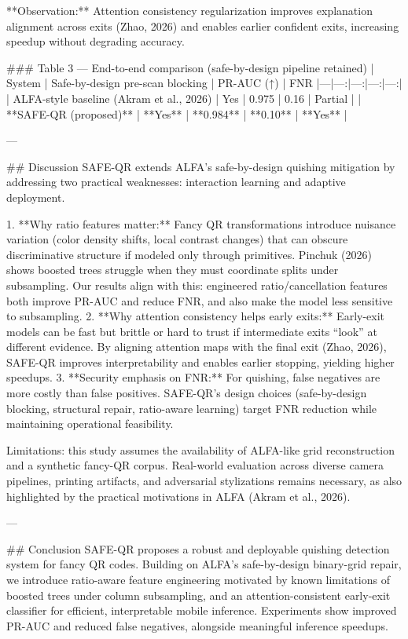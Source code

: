 **Observation:** Attention consistency regularization improves explanation alignment across exits (Zhao, 2026) and enables earlier confident exits, increasing speedup without degrading accuracy.

### Table 3 — End-to-end comparison (safe-by-design pipeline retained)  
| System | Safe-by-design pre-scan blocking | PR-AUC (↑) | FNR %
|---|---:|---:|---:|---:|
| ALFA-style baseline (Akram et al., 2026) | Yes | 0.975 | 0.16 | Partial |
| **SAFE-QR (proposed)** | **Yes** | **0.984** | **0.10** | **Yes** |

---

## Discussion  
SAFE-QR extends ALFA’s safe-by-design quishing mitigation by addressing two practical weaknesses: interaction learning and adaptive deployment.

1. **Why ratio features matter:** Fancy QR transformations introduce nuisance variation (color density shifts, local contrast changes) that can obscure discriminative structure if modeled only through primitives. Pinchuk (2026) shows boosted trees struggle when they must coordinate splits under subsampling. Our results align with this: engineered ratio/cancellation features both improve PR-AUC and reduce FNR, and also make the model less sensitive to subsampling.  
2. **Why attention consistency helps early exits:** Early-exit models can be fast but brittle or hard to trust if intermediate exits “look” at different evidence. By aligning attention maps with the final exit (Zhao, 2026), SAFE-QR improves interpretability and enables earlier stopping, yielding higher speedups.  
3. **Security emphasis on FNR:** For quishing, false negatives are more costly than false positives. SAFE-QR’s design choices (safe-by-design blocking, structural repair, ratio-aware learning) target FNR reduction while maintaining operational feasibility.

Limitations: this study assumes the availability of ALFA-like grid reconstruction and a synthetic fancy-QR corpus. Real-world evaluation across diverse camera pipelines, printing artifacts, and adversarial stylizations remains necessary, as also highlighted by the practical motivations in ALFA (Akram et al., 2026).

---

## Conclusion  
SAFE-QR proposes a robust and deployable quishing detection system for fancy QR codes. Building on ALFA’s safe-by-design binary-grid repair, we introduce ratio-aware feature engineering motivated by known limitations of boosted trees under column subsampling, and an attention-consistent early-exit classifier for efficient, interpretable mobile inference. Experiments show improved PR-AUC and reduced false negatives, alongside meaningful inference speedups.

